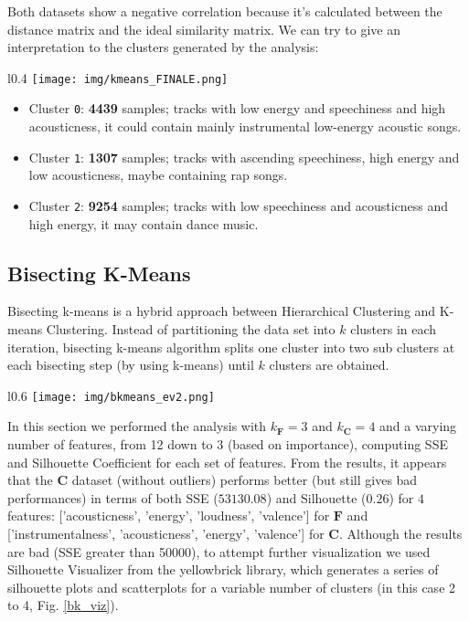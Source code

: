 Both datasets show a negative correlation because it's calculated between the distance matrix and the ideal similarity matrix. We can try to give an interpretation to the clusters generated by the analysis:\\
\begin{wrapfigure}{l}{0.4\textwidth}
\vspace{-0.8cm}
    \texttt{[image: img/kmeans\_FINALE.png]}
\caption{Teal: Cluster 0, Black: Cluster 1, Green: Cluster 2}
\vspace{-2cm}
\end{wrapfigure}
\begin{itemize}
    \item Cluster \texttt{0}: \textbf{4439} samples; tracks with low energy and speechiness and high acousticness, it could contain mainly instrumental low-energy acoustic songs.
    \item Cluster \texttt{1}: \textbf{1307} samples; tracks with ascending speechiness, high energy and low acousticness, maybe containing rap songs.
    \item Cluster \texttt{2}: \textbf{9254} samples; tracks with low speechiness and acousticness and high energy, it may contain dance music.
\end{itemize}
\subsection{Bisecting K-Means}
Bisecting k-means is a hybrid approach between Hierarchical Clustering and K-means Clustering. Instead of partitioning the data set into $k$ clusters in each iteration, bisecting k-means algorithm splits one cluster into two sub clusters at each bisecting step (by using k-means) until $k$ clusters are obtained.\\
\begin{wrapfigure}{l}{0.6\textwidth}
\texttt{[image: img/bkmeans\_ev2.png]}
\caption{Silhouette Visualizer, from $k=2$ to $k=4$.}
\label{bk_viz}
\end{wrapfigure}
In this section we performed the analysis with $k_\mathbf{F}=3$ and $k_\mathbf{C}=4$ and a varying number of features, from 12 down to 3 (based on importance), computing SSE and Silhouette Coefficient for each set of features. From the results, it appears that the $\mathbf{C}$ dataset (without outliers) performs better (but still gives bad performances) in terms of both SSE ($53130.08$) and Silhouette ($0.26$) for $4$ features: ['acousticness', 'energy', 'loudness', 'valence'] for $\mathbf{F}$ and ['instrumentalness', 'acousticness', 'energy', 'valence'] for $\mathbf{C}$. Although the results are bad (SSE greater than 50000), to attempt further visualization we used Silhouette Visualizer from the yellowbrick library, which generates a series of silhouette plots and scatterplots for a variable number of clusters (in this case 2 to 4, Fig. \ref{bk_viz}).
